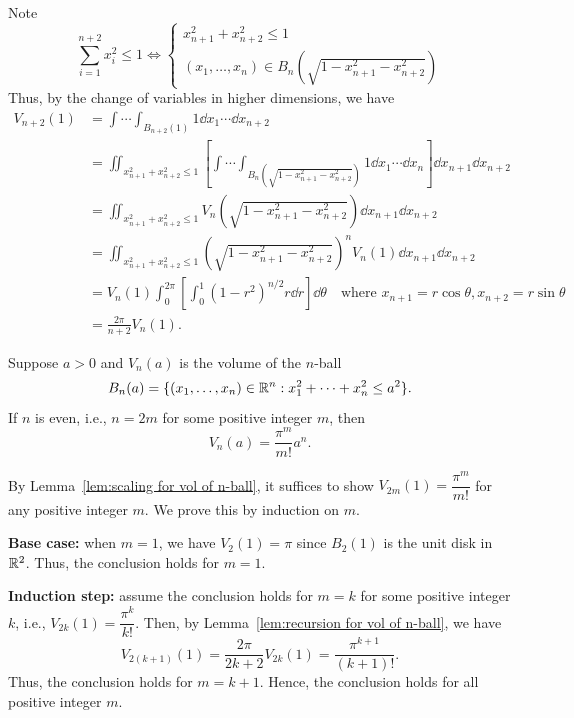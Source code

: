\begin{proofenv}
    Note
    \[
    \sum_{i=1}^{n+2} x_i^2 \leq 1 \Leftrightarrow \begin{cases}
        x_{n+1}^2 + x_{n+2}^2 \le 1 \\
        (x_1, \ldots, x_n) \in B_n(\sqrt{1 - x_{n+1}^2 - x_{n+2}^2})
    \end{cases}
    \]
    Thus, by the change of variables in higher dimensions, we have
    \[
    \begin{aligned}
        V_{n+2}(1) &= \int \cdots \int_{B_{n+2}(1)} 1 \dd x_1 \cdots \dd x_{n+2}\\[6pt] 
        &= \iint_{x_{n+1}^2 + x_{n+2}^2 \le 1} \left[ \int\cdots\int_{B_n(\sqrt{1 - x_{n+1}^2 - x_{n+2}^2})} 1 \dd x_1 \cdots \dd x_n \right] \dd x_{n+1} \dd x_{n+2}\\[6pt]
        &= \iint_{x_{n+1}^2 + x_{n+2}^2 \le 1} V_n(\sqrt{1 - x_{n+1}^2 - x_{n+2}^2}) \dd x_{n+1} \dd x_{n+2}\\[6pt]
        &= \iint_{x_{n+1}^2 + x_{n+2}^2 \le 1} \left( \sqrt{1 - x_{n+1}^2 - x_{n+2}^2} \right)^n V_n(1) \dd x_{n+1} \dd x_{n+2} \\
        &= V_n(1) \int_0^{2\pi} \left[ \int_0^1 (1 - r^2)^{n/2} r \dd r \right] \dd \theta \quad \text{where } x_{n+1} = r \cos \theta, x_{n+2} = r \sin \theta\\
        &= \frac{2\pi}{n+2} V_n(1).
    \end{aligned}
    \]
\end{proofenv}
\begin{propositionenv}
    Suppose $a>0$ and $V_n(a)$ is the volume of the $n$-ball
    $$ B_n(a) = \{(x_1, \ldots, x_n) \in \mathbb{R}^n : x_1^2 + \cdots + x_n^2 \leq a^2\}. $$
    If $n$ is even, i.e., $n = 2m$ for some positive integer $m$, then
    $$ V_n(a) = \frac{\pi^m}{m!} a^n. $$
\end{propositionenv}
\begin{proofenv}
    By Lemma~\ref{lem:scaling for vol of n-ball}, it suffices to show $V_{2m}(1) = \dfrac{\pi^m}{m!}$ for any positive integer $m$. We prove this by induction on $m$. 

    \textbf{Base case:} when $m=1$, we have $V_2(1) = \pi$ since $B_2(1)$ is the unit disk in $\mathbb{R}^2$. Thus, the conclusion holds for $m=1$.
    
    \textbf{Induction step:} assume the conclusion holds for $m = k$ for some positive integer $k$, i.e., $V_{2k}(1) = \dfrac{\pi^k}{k!}$. Then, by Lemma~\ref{lem:recursion for vol of n-ball}, we have
    \[
    V_{2(k+1)}(1) = \frac{2\pi}{2k+2} V_{2k}(1) = \frac{\pi^{k+1}}{(k+1)!}.
    \]
    Thus, the conclusion holds for $m = k+1$.  Hence, the conclusion holds for all positive integer $m$.
\end{proofenv}
